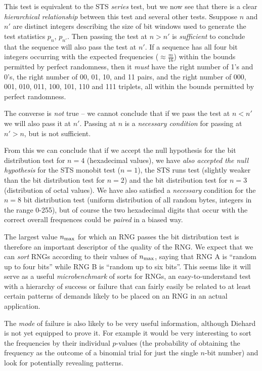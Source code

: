 \documentclass[12pt]{article}
\begin{document}
This test is equivalent to the STS {\em series} test, but we now see
that there is a clear {\em hierarchical relationship} between this test
and several other tests.  Ssuppose $n$ and $n'$ are distinct integers
describing the size of bit windows used to generate the test statistics
$p_n$, $p_{n'}$.  Then passing the test at $n > n'$ is {\em sufficient}
to conclude that the sequence will also pass the test at $n'$.  If a
sequence has all four bit integers occurring with the expected
frequencies ($\approx \frac{m}{16}$) within the bounds permitted by
perfect randomness, then it {\em must} have the right number of 1's and
0's, the right number of 00, 01, 10, and 11 pairs, and the right number
of 000, 001, 010, 011, 100, 101, 110 and 111 triplets, all within the
bounds permitted by perfect randomness.

The converse is {\em not} true -- we cannot conclude that if we pass the
test at $n < n'$ we will also pass it at $n'$.  Passing at $n$ is a {\em
necessary condition} for passing at $n' > n$, but is not sufficient.

From this we can conclude that if we accept the null hypothesis for the
bit distribution test for $n = 4$ (hexadecimal values), we have {\em
also accepted the null hypothesis} for the STS monobit test ($n = 1$),
the STS runs test (slightly weaker than the bit distribution test for $n
= 2$) and the bit distribution test for $n = 3$ (distribution of octal
values).  We have also satisfied a {\em necessary} condition for the $n
= 8$ bit distribution test (uniform distribution of all random bytes,
integers in the range 0-255), but of course the two hexadecimal digits
that occur with the correct overall frequences could be {\em paired} in
a biased way.

The largest value $n_{\rm max}$ for which an RNG passes the bit
distribution test is therefore an important descriptor of the quality of
the RNG.  We expect that we can {\em sort} RNGs according to their
values of $n_{\rm max}$, saying that RNG A is ``random up to four bits''
while RNG B is ``random up to six bits''.  This seems like it will
serve as a useful {\em microbenchmark} of sorts for RNGs, an
easy-to-understand test with a hierarchy of success or failure that can
fairly easily be related to at least certain patterns of demands likely
to be placed on an RNG in an actual application.

The {\em mode} of failure is also likely to be very useful information,
although Diehard is not yet equipped to prove it.  For example it would
be very interesting to sort the frequencies by their individual
$p$-values (the probability of obtaining the frequency as the outcome of
a binomial trial for just the single $n$-bit number) and look for
potentially revealing patterns.
\end{document}
